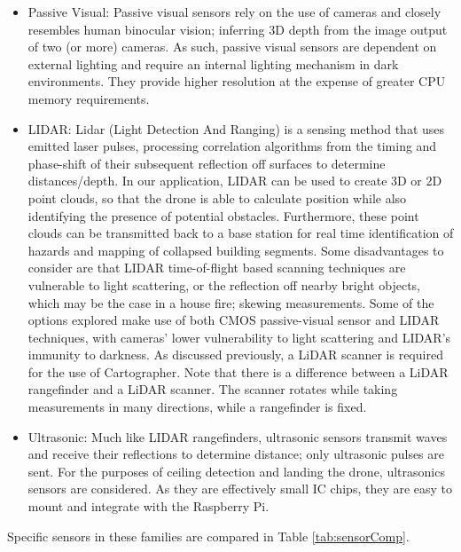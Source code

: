 \documentclass[capstone_report.tex]{subfiles}
\begin{document}
\begin{itemize}
\item Passive Visual: Passive visual sensors rely on the use of cameras and closely resembles human binocular vision; inferring 3D depth from the image output of two (or more) cameras. As such, passive visual sensors are dependent on external lighting and require an internal lighting mechanism in dark environments. They provide higher resolution at the expense of greater CPU memory requirements. 
\item LIDAR: Lidar (Light Detection And Ranging) is a sensing method that uses emitted laser pulses, processing correlation algorithms from the timing and phase-shift of their subsequent reflection off surfaces to determine distances/depth. In our application, LIDAR can be used to create 3D or 2D point clouds, so that the drone is able to calculate position while also identifying the presence of potential obstacles. Furthermore, these point clouds can be transmitted back to a base station for real time identification of hazards and mapping of collapsed building segments. Some disadvantages to consider are that LIDAR time-of-flight based scanning techniques are vulnerable to light scattering, or the reflection off nearby bright objects, which may be the case in a house fire; skewing measurements. Some of the options explored make use of both CMOS passive-visual sensor and LIDAR techniques, with cameras’ lower vulnerability to light scattering and LIDAR’s immunity to darkness. As discussed previously, a LiDAR scanner is required for the use of Cartographer. Note that there is a difference between a LiDAR rangefinder and a LiDAR scanner. The scanner rotates while taking measurements in many directions, while a rangefinder is fixed.
\item Ultrasonic: Much like LIDAR rangefinders, ultrasonic sensors transmit waves and receive their reflections to determine distance; only ultrasonic pulses are sent. For the purposes of ceiling detection and landing the drone, ultrasonics sensors are considered. As they are effectively small IC chips, they are easy to mount and integrate with the Raspberry Pi.
\end{itemize}

Specific sensors in these families are compared in Table \ref{tab:sensorComp}.
\end{document}
